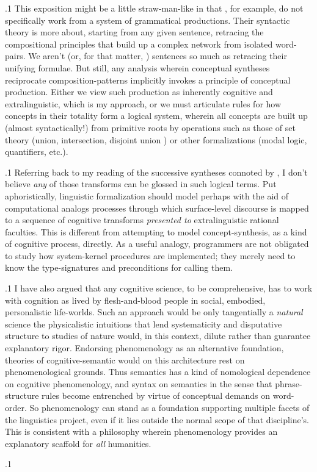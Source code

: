 \documentclass[11pt, twocolumn]{article}
\begin{document}
\p.1{%
\:\+This exposition might be a little straw-man-like in that \Boltetal{},
for example, do not specifically work from a system of grammatical
productions. \>  Their syntactic theory is more about, starting
from any given sentence, retracing the compositional principles
that build up a complex network from isolated word-pairs. \> 
We aren't  (or, for that matter, ) sentences
so much as retracing their unifying formulae. \>  But still,
any analysis wherein conceptual syntheses
reciprocate composition-patterns implicitly invokes a
principle of conceptual production. \> 
Either we view such production as inherently cognitive and extralinguistic, which is
my approach, or we must articulate rules for how concepts
in their totality form a logical system, wherein all concepts are
built up (almost syntactically!) from primitive roots by operations such as
those of set theory (union, intersection, disjoint union \ellThree{2pt}{2pt})
or other formalizations (modal logic, quantifiers, etc.).\<\;
}%

\p.1{%
\:\+Referring back to my reading of the successive syntheses
connoted by , I don't believe
\textit{any} of those transforms can be glossed in such logical terms. \> 
Put aphoristically, linguistic formalization should model
\mdash{} perhaps with the aid of computational analogs \mdash{} processes
through which surface-level discourse is mapped to a sequence
of cognitive transforms \textit{presented to} extralinguistic
rational faculties. \>  This is different from attempting
to model concept-synthesis, as a kind of
 cognitive process,
directly. \>  As a useful analogy, programmers are not obligated to
study how system-kernel procedures are implemented; they merely
need to know the type-signatures and preconditions for calling them.\<\;
}%

\p.1{%
\:\+I have also argued that any cognitive
science, to be comprehensive, has to work
with cognition as lived by flesh-and-blood
people in social, embodied, personalistic life-worlds. \> 
Such an approach would be only tangentially a
\textit{natural} science \mdash{} the physicalistic
intuitions that lend systematicity
and \pgl{}disputative structure to studies of nature
would, in this context, dilute rather than
guarantee explanatory rigor. \>  Endorsing
phenomenology as an alternative foundation,
theories of cognitive-semantic 
would \mdash{} on this architecture \mdash{} rest on phenomenological
grounds. \>  Thus semantics has a
kind of nomological dependence
on cognitive phenomenology, and
syntax on semantics in the sense
that phrase-structure rules become entrenched
by virtue of conceptual demands on word-order. \> 
So phenomenology can stand as a foundation
supporting multiple facets of the
linguistics project, even if it
lies outside the normal scope of that
discipline's. \>  This is consistent with a
philosophy wherein
phenomenology provides an explanatory
scaffold for \textit{all} humanities.\<\;
}%

\pa.1{%
\;
}%
\end{document}
